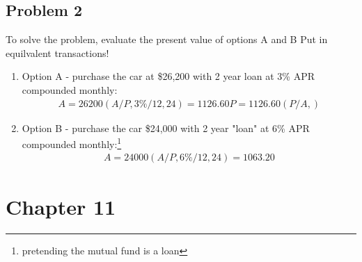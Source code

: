 \documentclass{report} %
\begin{document}
\subsection*{Problem 2} 
To solve the problem, evaluate the present value of options A and B 
Put in equilvalent transactions!
\begin{enumerate}
    \item Option A - purchase the car at \$26,200 with 2 year loan at 3\% APR compounded monthly: 
    \begin{equation*}
        \begin{aligned}
            A = 26200(A/P,3\%/12,24) = 1126.60
            P = 1126.60(P/A,)
        \end{aligned}
    \end{equation*}
    \item Option B - purchase the car \$24,000 with 2 year "loan" at 6\% APR compounded monthly:\footnote{pretending the mutual fund is a loan}
    \begin{equation*}
        \begin{aligned}
            A = 24000(A/P,6\%/12,24) = 1063.20
        \end{aligned}
    \end{equation*}
\end{enumerate}

\section*{Chapter 11}
\end{document}
